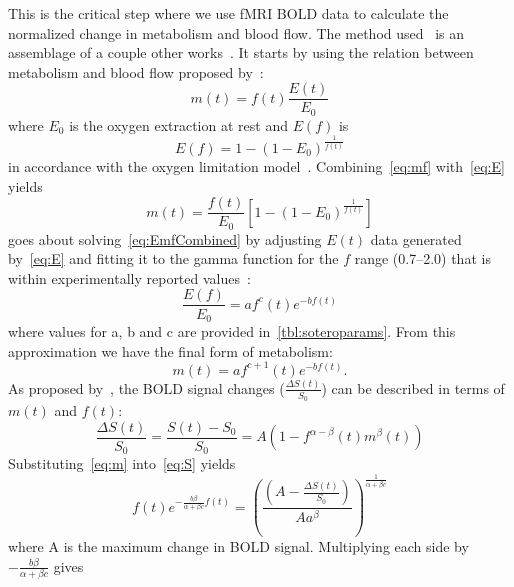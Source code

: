     This is the critical step where we use fMRI BOLD data to calculate the normalized change in metabolism and blood flow.  The method used~\citep{sotero2011} is an assemblage of a couple other works~\citep{buxton2004,buxton1997,fox1988,leithner2009,lin2010,davis1998}. It starts by using the relation between metabolism and blood flow proposed by~\citet{buxton2004}:
    \begin{equation} \label{eq:mf}
      m(t)=f(t)\frac{E(t)}{E_0}
    \end{equation}
  where $E_0$ is the oxygen extraction at rest and $E(f)$ is
    \begin{equation} \label{eq:E}
      E(f)=1-(1-E_0)^{\frac{1}{f(t)}}
    \end{equation}
  in accordance with the oxygen limitation model~\citep{buxton1997}.  Combining~\cref{eq:mf} with~\cref{eq:E} yields
    \begin{equation} \label{eq:EmfCombined}
      m(t)=\frac{f(t)}{E_0}\left[1-(1-E_0)^{\frac{1}{f(t)}}\right]
    \end{equation}
   goes about solving~\cref{eq:EmfCombined} by adjusting $E(t)$ data generated by~\cref{eq:E} and fitting it to the gamma function for the $f$ range (0.7--2.0) that is within experimentally reported values~\citep{fox1988,leithner2009,lin2010}:
    \begin{equation} \label{eq:gammafct}
      \frac{E(f)}{E_0}=af^{c}(t)e^{-bf(t)}
    \end{equation}
  where values for a, b and c are provided in~\cref{tbl:soteroparams}.  From this approximation we have the final form of metabolism:
    \begin{equation} \label{eq:m} 
      m(t)=af^{c+1}(t)e^{-bf(t)}.
    \end{equation}
  As proposed by~\citet{davis1998}, the BOLD signal changes ($\frac{\Delta S(t)}{S_0}$) can be described in terms of $m(t)$ and $f(t)$:
    \begin{equation} \label{eq:S}
      \frac{\Delta S(t)}{S_0} = \frac{S(t)-S_0}{S_0} = A(1-f^{\alpha-\beta}(t) m^\beta(t))
    \end{equation}
  Substituting~\cref{eq:m} into~\cref{eq:S} yields
    \begin{equation} \label{eq:mAndS}
      f(t)e^{-\frac{b \beta}{\alpha + \beta c}f(t)}=\left(\frac{\left(A-\frac{\Delta S(t)}{S_0}\right)}{A a^\beta}\right)^{\frac{1}{\alpha+\beta c}}
    \end{equation}
  where A is the maximum change in BOLD signal.  Multiplying each side by $-\frac{b\beta}{\alpha+\beta c}$ gives

